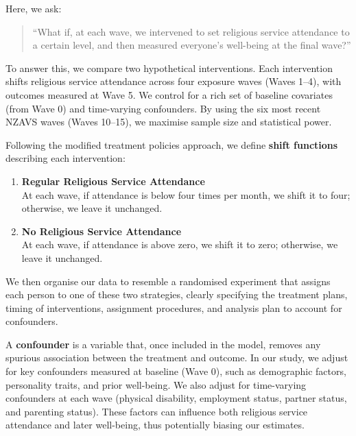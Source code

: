 \documentclass[
  single column]{article}
\begin{document}
Here, we ask:

\begin{quote}
``What if, at each wave, we intervened to set religious service
attendance to a certain level, and then measured everyone's well-being
at the final wave?''
\end{quote}

To answer this, we compare two hypothetical interventions. Each
intervention shifts religious service attendance across four exposure
waves (Waves 1--4), with outcomes measured at Wave 5. We control for a
rich set of baseline covariates (from Wave 0) and time-varying
confounders. By using the six most recent NZAVS waves (Waves 10--15), we
maximise sample size and statistical power.

Following the modified treatment policies approach, we define
\textbf{shift functions} describing each intervention:

\begin{enumerate}
\def\labelenumi{\arabic{enumi}.}
\item
  \textbf{Regular Religious Service Attendance}\\
  At each wave, if attendance is below four times per month, we shift it
  to four; otherwise, we leave it unchanged.
\item
  \textbf{No Religious Service Attendance}\\
  At each wave, if attendance is above zero, we shift it to zero;
  otherwise, we leave it unchanged.
\end{enumerate}

We then organise our data to resemble a randomised experiment that
assigns each person to one of these two strategies, clearly specifying
the treatment plans, timing of interventions, assignment procedures, and
analysis plan to account for confounders.

A \textbf{confounder} is a variable that, once included in the model,
removes any spurious association between the treatment and outcome. In
our study, we adjust for key confounders measured at baseline (Wave 0),
such as demographic factors, personality traits, and prior well-being.
We also adjust for time-varying confounders at each wave (physical
disability, employment status, partner status, and parenting status).
These factors can influence both religious service attendance and later
well-being, thus potentially biasing our estimates.
\end{document}
